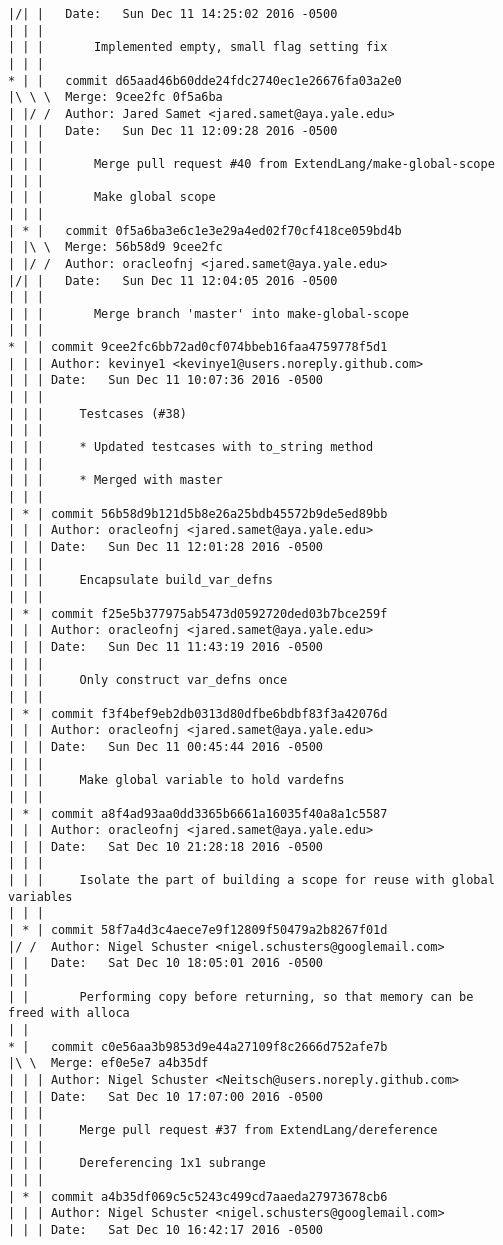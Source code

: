 \begin{lstlisting}
|/| |   Date:   Sun Dec 11 14:25:02 2016 -0500
| | |   
| | |       Implemented empty, small flag setting fix
| | |      
* | |   commit d65aad46b60dde24fdc2740ec1e26676fa03a2e0
|\ \ \  Merge: 9cee2fc 0f5a6ba
| |/ /  Author: Jared Samet <jared.samet@aya.yale.edu>
| | |   Date:   Sun Dec 11 12:09:28 2016 -0500
| | |   
| | |       Merge pull request #40 from ExtendLang/make-global-scope
| | |       
| | |       Make global scope
| | |      
| * |   commit 0f5a6ba3e6c1e3e29a4ed02f70cf418ce059bd4b
| |\ \  Merge: 56b58d9 9cee2fc
| |/ /  Author: oracleofnj <jared.samet@aya.yale.edu>
|/| |   Date:   Sun Dec 11 12:04:05 2016 -0500
| | |   
| | |       Merge branch 'master' into make-global-scope
| | |    
* | | commit 9cee2fc6bb72ad0cf074bbeb16faa4759778f5d1
| | | Author: kevinye1 <kevinye1@users.noreply.github.com>
| | | Date:   Sun Dec 11 10:07:36 2016 -0500
| | | 
| | |     Testcases (#38)
| | |     
| | |     * Updated testcases with to_string method
| | |     
| | |     * Merged with master
| | |    
| * | commit 56b58d9b121d5b8e26a25bdb45572b9de5ed89bb
| | | Author: oracleofnj <jared.samet@aya.yale.edu>
| | | Date:   Sun Dec 11 12:01:28 2016 -0500
| | | 
| | |     Encapsulate build_var_defns
| | |    
| * | commit f25e5b377975ab5473d0592720ded03b7bce259f
| | | Author: oracleofnj <jared.samet@aya.yale.edu>
| | | Date:   Sun Dec 11 11:43:19 2016 -0500
| | | 
| | |     Only construct var_defns once
| | |    
| * | commit f3f4bef9eb2db0313d80dfbe6bdbf83f3a42076d
| | | Author: oracleofnj <jared.samet@aya.yale.edu>
| | | Date:   Sun Dec 11 00:45:44 2016 -0500
| | | 
| | |     Make global variable to hold vardefns
| | |    
| * | commit a8f4ad93aa0dd3365b6661a16035f40a8a1c5587
| | | Author: oracleofnj <jared.samet@aya.yale.edu>
| | | Date:   Sat Dec 10 21:28:18 2016 -0500
| | | 
| | |     Isolate the part of building a scope for reuse with global variables
| | |    
| * | commit 58f7a4d3c4aece7e9f12809f50479a2b8267f01d
|/ /  Author: Nigel Schuster <nigel.schusters@googlemail.com>
| |   Date:   Sat Dec 10 18:05:01 2016 -0500
| |   
| |       Performing copy before returning, so that memory can be freed with alloca
| |     
* |   commit c0e56aa3b9853d9e44a27109f8c2666d752afe7b
|\ \  Merge: ef0e5e7 a4b35df
| | | Author: Nigel Schuster <Neitsch@users.noreply.github.com>
| | | Date:   Sat Dec 10 17:07:00 2016 -0500
| | | 
| | |     Merge pull request #37 from ExtendLang/dereference
| | |     
| | |     Dereferencing 1x1 subrange
| | |    
| * | commit a4b35df069c5c5243c499cd7aaeda27973678cb6
| | | Author: Nigel Schuster <nigel.schusters@googlemail.com>
| | | Date:   Sat Dec 10 16:42:17 2016 -0500

\end{lstlisting}
